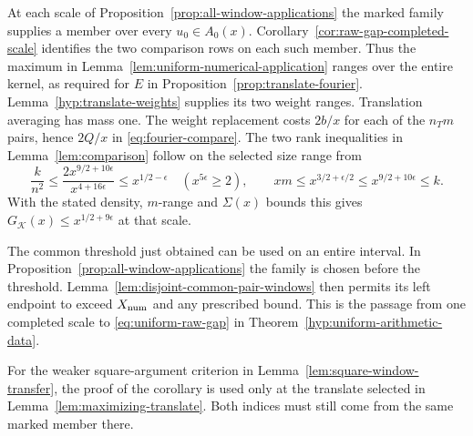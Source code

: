 At each scale of Proposition~\ref{prop:all-window-applications} the marked
family supplies a member over every \(u_0\in A_0(x)\). Corollary~\ref{cor:raw-gap-completed-scale}
identifies the two comparison rows on each such member. Thus the maximum in
Lemma~\ref{lem:uniform-numerical-application} ranges over the entire kernel,
as required for \(E\) in Proposition~\ref{prop:translate-fourier}.
Lemma~\ref{hyp:translate-weights} supplies its two weight ranges. Translation averaging has mass one. The weight replacement costs \(2b/x\) for each of the \(n_Tm\) pairs, hence \(2Q/x\) in \eqref{eq:fourier-compare}. The two rank inequalities in Lemma~\ref{lem:comparison} follow on the selected size range from
\[
 \frac{k}{n^2}\le\frac{2x^{9/2+10\epsilon}}{x^{4+16\epsilon}}
     \le x^{1/2-\epsilon}\quad(x^{5\epsilon}\ge2),\qquad
 xm\le x^{3/2+\epsilon/2}\le x^{9/2+10\epsilon}\le k .
\]
With the stated density, \(m\)-range and \(\Sigma(x)\) bounds this gives \(G_{\mathcal K}(x)\le x^{1/2+9\epsilon}\) at that scale.

The common threshold just obtained can be used on an entire
interval. In Proposition~\ref{prop:all-window-applications} the
family is chosen before the threshold. Lemma~\ref{lem:disjoint-common-pair-windows}
then permits its left endpoint to exceed \(X_{\rm num}\) and
any prescribed bound. This is the passage from one completed
scale to \eqref{eq:uniform-raw-gap} in
Theorem~\ref{hyp:uniform-arithmetic-data}.

For the weaker square-argument criterion in Lemma~\ref{lem:square-window-transfer},
the proof of the corollary is used only at the translate selected in
Lemma~\ref{lem:maximizing-translate}. Both indices must still come from
the same marked member there.
